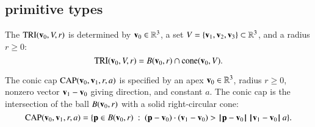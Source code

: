 \subsection{primitive types}
%

\begin{definition}
 The 
${\operatorname{TRI}}({\mathbf v}_0,V,r)$ is determined by ${\mathbf v}_0\in\mathbb{R}^3$, a 
set $V=\{{\mathbf v}_1,{\mathbf v}_2,{\mathbf v}_3\}\subset\mathbb{R}^3$, and a radius $r\ge0$:
\[ 
{\operatorname{TRI}}({\mathbf v}_0,V,r) = 
B({\mathbf v}_0,r)\cap {\operatorname{cone}}({\mathbf v}_0,V).
\] 
%
%
%
\end{definition}



%


\begin{definition}
The conic cap ${\operatorname{CAP}}({\mathbf v}_0,{\mathbf v}_1,r,a)$ is specified by an apex
${\mathbf v}_0\in\mathbb{R}^3$,  radius $r\ge0$,  nonzero vector ${\mathbf v}_1-{\mathbf v}_0$ giving
direction, and constant $a$.  The conic cap is the intersection of
the ball $B({\mathbf v}_0,r)$ with a solid right-circular cone:
\[ 
\op{CAP}(\v_0,\v_1,r,a)=\{\p \in B(\v_0,r) 
\mid (\p-\v_0)\cdot (\v_1-\v_0) > \norm{\p}{\v_0}\, \norm{\v_1}{\v_0}\, a\}.
\] 
%
%
%
%
\end{definition}

%

